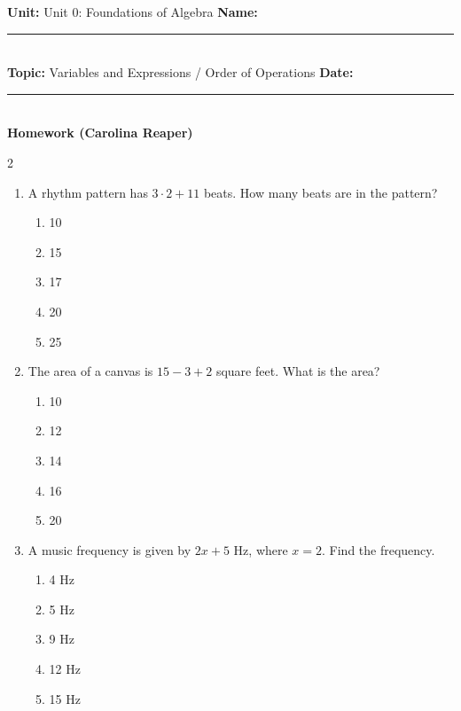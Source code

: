 \documentclass[10pt]{article}
\begin{document}
\enlargethispage{2.5cm}

\begin{tcolorbox}[colback=mainblue!5, colframe=mainblue, sharp corners, boxrule=0.5pt]
    \small \textbf{Unit:} Unit 0: Foundations of Algebra \hfill \textbf{Name:} \rule{3cm}{0.4pt} \\
    \small \textbf{Topic:} Variables and Expressions / Order of Operations \hfill \textbf{Date:} \rule{2cm}{0.4pt} \\
    \centering \textbf{\large Homework (Carolina Reaper)}
\end{tcolorbox}

\vspace{0.2cm}

\begin{multicols}{2}
\begin{enumerate}[label=\textbf{Q\arabic*.}, leftmargin=*, itemsep=6pt, parsep=0pt]

  \item \small A rhythm pattern has $3 \cdot 2 + 11$ beats. How many beats are in the pattern?
  \begin{enumerate}[label=(\Alph*), leftmargin=0.6cm, nosep, itemsep=2pt]
    \item 10
    \item 15
    \item 17
    \item 20
    \item 25
  \end{enumerate}

  \item \small The area of a canvas is $15 - 3 + 2$ square feet. What is the area?
  \begin{enumerate}[label=(\Alph*), leftmargin=0.6cm, nosep, itemsep=2pt]
    \item 10
    \item 12
    \item 14
    \item 16
    \item 20
  \end{enumerate}

  \item \small A music frequency is given by $2x + 5$ Hz, where $x = 2$. Find the frequency.
  \begin{enumerate}[label=(\Alph*), leftmargin=0.6cm, nosep, itemsep=2pt]
    \item 4 Hz
    \item 5 Hz
    \item 9 Hz
    \item 12 Hz
    \item 15 Hz
  \end{enumerate}


\end{enumerate}
\end{multicols}
\end{document}
